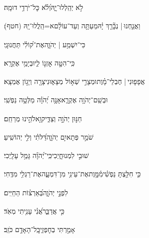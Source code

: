 \documentclass[12pt]{article}
\newcommand{\loc}[1]{\textsuperscript{\locf{#1}}}
\begin{document}
{\loc{ יז}~}‏לֹ֣א  יְהַֽלְלוּ־יָ֑הּ{\hfill}וְ֝לֹ֗א כׇּל־יֹרְדֵ֥י דוּמָֽה׃\par

{\loc{ יח}~}‏וַאֲנַ֤חְנוּ | {\hfill}נְבָ֘רֵ֤ךְ יָ֗הּ\newline\hspace*{.5em}מֵעַתָּ֥ה וְעַד־עוֹלָ֗ם{\hfill}א=הַֽלֲלוּ־יָֽהּ (חטף)׃\par\pend
\ledpb
\pstart[\subsection*{\textcolor{red}{פרק קטז}}]\label{פרק קטז}
{\loc{ א}~}‏ כִּי־יִשְׁמַ֥ע | יְהֹוָ֑ה{\hfill}אֶת־ק֝וֹלִ֗י תַּחֲנוּנָֽי׃\par

{\loc{ ב}~}‏כִּֽי־הִטָּ֣ה אׇזְנ֣וֹ לִ֑י{\hfill}וּבְיָמַ֥י אֶקְרָֽא׃\par

{\loc{ ג}~}‏אֲפָפ֤וּנִי | {\hfill}חֶבְלֵי־מָ֗וֶת\newline\hspace*{.5em}וּמְצָרֵ֣י שְׁא֣וֹל מְצָא֑וּנִי{\hfill}צָרָ֖ה וְיָג֣וֹן אֶמְצָֽא׃\par

{\loc{ ד}~}‏וּבְשֵֽׁם־יְהֹוָ֥ה אֶקְרָ֑א{\hfill}אָנָּ֥ה יְ֝הֹוָ֗ה מַלְּטָ֥ה נַפְשִֽׁי׃\par

{\loc{ ה}~}‏חַנּ֣וּן יְהֹוָ֣ה וְצַדִּ֑יק{\hfill}וֵ֖אלֹהֵ֣ינוּ מְרַחֵֽם׃\par

{\loc{ ו}~}‏שֹׁמֵ֣ר פְּתָאיִ֣ם יְהֹוָ֑ה{\hfill}דַּ֝לֹּתִ֗י וְלִ֣י יְהוֹשִֽׁיעַ׃\par

{\loc{ ז}~}‏שׁוּבִ֣י  לִמְנוּחָ֑יְכִי{\hfill}כִּֽי־יְ֝הֹוָ֗ה גָּמַ֥ל עָלָֽיְכִי׃\par

{\loc{ ח}~}‏כִּ֤י חִלַּ֥צְתָּ נַפְשִׁ֗י{\hfill}מִ֫מָּ֥וֶת\newline\hspace*{.5em}אֶת־עֵינִ֥י מִן־דִּמְעָ֑ה{\hfill}אֶת־רַגְלִ֥י מִדֶּֽחִי׃\par

{\loc{ ט}~}‏ לִפְנֵ֣י יְהֹוָ֑ה{\hfill}בְּ֝אַרְצ֗וֹת הַחַיִּֽים׃\par

{\loc{ י}~}‏ כִּ֣י אֲדַבֵּ֑ר{\hfill}אֲ֝נִ֗י עָנִ֥יתִי מְאֹֽד׃\par

{\loc{ יא}~}‏ אָמַ֣רְתִּי בְחׇפְזִ֑י{\hfill}כׇּֽל־הָאָדָ֥ם כֹּזֵֽב׃\par
\end{document}
